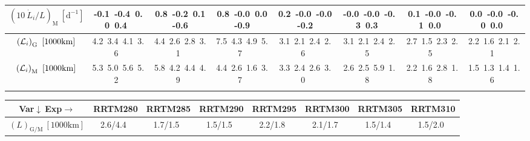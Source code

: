 \begin{table}[H]
{\begin{centering}
\begin{tabular}{|c|c|c|c|c|c|c|c|}
\hline
$\left(10\ \dot{L}_{i}/L\right)_{\mathrm{M}}\ \left[\mathrm{d^{-1}}\right]$ & \textcolor{C1}{-0.1}\ \textcolor{C2}{-0.4}\ \textcolor{C3}{0.0}\ \textcolor{C4}{0.4}\  & \textcolor{C1}{0.8}\ \textcolor{C2}{-0.2}\ \textcolor{C3}{0.1}\ \textcolor{C4}{-0.6}\  & \textcolor{C1}{0.8}\ \textcolor{C2}{-0.0}\ \textcolor{C3}{0.0}\ \textcolor{C4}{-0.9}\  & \textcolor{C1}{0.2}\ \textcolor{C2}{-0.0}\ \textcolor{C3}{-0.0}\ \textcolor{C4}{-0.2}\  & \textcolor{C1}{-0.0}\ \textcolor{C2}{-0.0}\ \textcolor{C3}{-0.3}\ \textcolor{C4}{0.3}\  & \textcolor{C1}{0.1}\ \textcolor{C2}{-0.0}\ \textcolor{C3}{-0.1}\ \textcolor{C4}{0.0}\  & \textcolor{C1}{0.0}\ \textcolor{C2}{-0.0}\ \textcolor{C3}{-0.0}\ \textcolor{C4}{0.0}\  \tabularnewline
\hline
$\left({\cal L}_{i}\right)_{\mathrm{G}}\ \left[1000\mathrm{km}\right]$ & \textcolor{C1}{4.2}\ \textcolor{C2}{3.4}\ \textcolor{C3}{4.1}\ \textcolor{C4}{3.6}\  & \textcolor{C1}{4.4}\ \textcolor{C2}{2.6}\ \textcolor{C3}{2.8}\ \textcolor{C4}{3.1}\  & \textcolor{C1}{7.5}\ \textcolor{C2}{4.3}\ \textcolor{C3}{4.9}\ \textcolor{C4}{5.7}\  & \textcolor{C1}{3.1}\ \textcolor{C2}{2.1}\ \textcolor{C3}{2.4}\ \textcolor{C4}{2.6}\  & \textcolor{C1}{3.1}\ \textcolor{C2}{2.1}\ \textcolor{C3}{2.4}\ \textcolor{C4}{2.5}\  & \textcolor{C1}{2.7}\ \textcolor{C2}{1.5}\ \textcolor{C3}{2.3}\ \textcolor{C4}{2.5}\  & \textcolor{C1}{2.2}\ \textcolor{C2}{1.6}\ \textcolor{C3}{2.1}\ \textcolor{C4}{2.1}\  \tabularnewline
\hline
$\left({\cal L}_{i}\right)_{\mathrm{M}}\ \left[1000\mathrm{km}\right]$ & \textcolor{C1}{5.3}\ \textcolor{C2}{5.0}\ \textcolor{C3}{5.6}\ \textcolor{C4}{5.2}\  & \textcolor{C1}{5.8}\ \textcolor{C2}{4.2}\ \textcolor{C3}{4.4}\ \textcolor{C4}{4.9}\  & \textcolor{C1}{4.4}\ \textcolor{C2}{2.6}\ \textcolor{C3}{1.6}\ \textcolor{C4}{3.7}\  & \textcolor{C1}{3.3}\ \textcolor{C2}{2.4}\ \textcolor{C3}{2.6}\ \textcolor{C4}{3.0}\  & \textcolor{C1}{2.6}\ \textcolor{C2}{2.5}\ \textcolor{C3}{5.9}\ \textcolor{C4}{1.8}\  & \textcolor{C1}{2.2}\ \textcolor{C2}{1.6}\ \textcolor{C3}{2.8}\ \textcolor{C4}{1.8}\  & \textcolor{C1}{1.5}\ \textcolor{C2}{1.3}\ \textcolor{C3}{1.4}\ \textcolor{C4}{1.6}\  \tabularnewline
\hline
 &  &  &  &  &  &  & \tabularnewline
\hline
\end{tabular}
\begin{tabular}{|c|c|c|c|c|c|c|c|}
\hline
Var$\downarrow\ $Exp$\rightarrow$ & RRTM280 & RRTM285 & RRTM290 & RRTM295 & RRTM300 & RRTM305 & RRTM310 \tabularnewline
\hline
\hline
$\left(L\right)_{\mathrm{G/M}}\ \left[1000\mathrm{km}\right]$ & 2.6/4.4\ & 1.7/1.5\ & 1.5/1.5\ & 2.2/1.8\ & 2.1/1.7\ & 1.5/1.4\ & 1.5/2.0\ \tabularnewline

\end{tabular}
\end{centering}}
\end{table}
